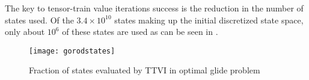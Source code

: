 The key to tensor-train value iterations success is the reduction in the number of states used. Of the $3.4 \times 10^{10}$ states making up the initial discretized state space, only about $10^6$ of these states are used as can be seen in .\cite{Gorod}
\begin{figure}
\centering
\texttt{[image: gorodstates]}
\caption{Fraction of states evaluated by TTVI in optimal glide problem \cite{Gorod}}
\label{gorodstates}
\end{figure}